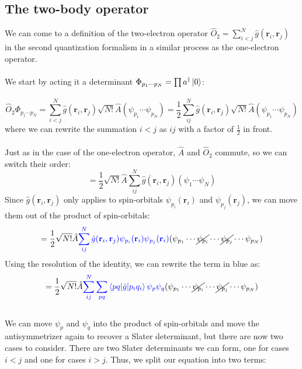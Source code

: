 \documentclass{article}
\newcommand{\dg}{\ensuremath{^\dagger} }
\newcommand{\cd}{\ensuremath{\cdots} }
\def\*#1{\mathbf{#1}}
\begin{document}
\subsection{The two-body operator}
We can come to a definition of the two-electron operator $\hat{O}_2 = \sum\limits_{i < j} ^N \hat{g} (\*{r}_i, \*{r}_j) $ 
in the second quantization formalism in a similar process as the one-electron operator. 
\\ \\
We start by acting it a determinant $ \Phi_{p_1 \cdots p_N} = \prod a\dg \ket{0} $:  \\ \\
\[\hat{O}_2 \Phi_{p_1 \cdots p_N} = \sum\limits_{i < j} ^N \hat{g} (\*{r}_i, \*{r}_j)  \sqrt{N!} \hat{A} (\psi_{p_1} \cdots \psi_{p_N}) =  \frac{1}{2} \sum\limits_{i j} ^N \hat{g} (\*{r}_i, \*{r}_j)  \sqrt{N!} \hat{A} (\psi_{p_1} \cdots \psi_{p_N}) \] 
where we can rewrite the summation $i < j$ as $ij$ with a factor of $\frac{1}{2}$ in front. \\ \\
Just as in the case of the one-electron operator, $\hat{A}$ and $\hat{O}_2$ commute, so we can switch their order: 
\[= \frac{1}{2} \sqrt{N!}  \hat{A} \sum\limits_{i j} ^N \hat{g} (\*{r}_i, \*{r}_j)  (\psi_1 \cdots \psi_N) \]
Since $\hat{g} (\*{r}_i, \*{r}_j)  $ only applies to spin-orbitals $\psi_{p_i}(\*{r}_i)$ and $\psi_{p_j}(\*{r}_j)$, we can move them out of the product of spin-orbitals:
\[= \frac{1}{2} \sqrt{N!}  \hat{A} {\color{blue}  \sum\limits_{i j} ^N \hat{g} (\*{r}_i, \*{r}_j) \psi_{p_i} (\*{r}_i) \psi_{p_j} (\*{r}_i)} (\psi_{p_1} \cdots \cancel{\psi_{p_i}} \cd  \cancel{\psi_{p_j}} \cdots \psi_{p_N}) \]
Using the resolution of the identity, we can rewrite the term in {\color{blue}blue} as: 
\[= \frac{1}{2}  \sqrt{N!}   \hat{A}  {\color{blue}  \sum\limits_{i j} ^N   \sum_{pq}  \braket{pq | \hat{g} | p_i q_i } \psi_p \psi_q }  (\psi_{p_1} \cdots \cancel{\psi_{p_i}} \cd  \cancel{\psi_{p_j}} \cdots \psi_{p_N}) \]
\\ 
 We can move $\psi_p$  and $\psi_q$ into the product of spin-orbitals and move the antisymmetrizer again to recover a Slater determinant, but there are now two cases to consider.
 There are two Slater determinants we can form, one for cases $i < j$ and one for cases $i > j$. 
 Thus, we split our equation into two terms: 
\end{document}
